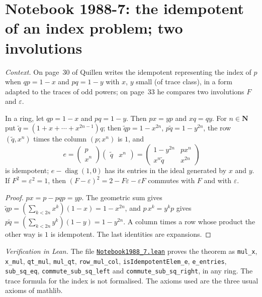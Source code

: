 \section[Notebook 1988-7: the idempotent of an index problem]{Notebook 1988-7: the idempotent of an index problem; two involutions\protect{}}\label{sec:quillen-1988-7}

\emph{Context.} On page~30 of  Quillen writes the idempotent representing the index of $p$ when $qp = 1 - x$ and $pq = 1 - y$ with $x$, $y$ small (of trace class), in a form adapted to the traces of odd powers; on page~33 he compares two involutions $F$ and $\varepsilon$.

\begin{encadre}
\begin{theoreme}\label{thm:quillen-1988-7}
In a ring, let $qp = 1 - x$ and $pq = 1 - y$. Then $px = yp$ and $xq = qy$. For $n \in \mathbf N$ put $\tilde q = (1 + x + \cdots + x^{2n-1})q$; then $\tilde qp = 1 - x^{2n}$, $p\tilde q = 1 - y^{2n}$, the row $(\tilde q, x^n)$ times the column $(p; x^n)$ is $1$, and
\[
e = \begin{pmatrix} p\\ x^n\end{pmatrix}\begin{pmatrix}\tilde q & x^n\end{pmatrix} = \begin{pmatrix} 1 - y^{2n} & px^n\\ x^n\tilde q & x^{2n}\end{pmatrix}
\]
is idempotent; $e - \operatorname{diag}(1, 0)$ has its entries in the ideal generated by $x$ and $y$. If $F^2 = \varepsilon^2 = 1$, then $(F - \varepsilon)^2 = 2 - F\varepsilon - \varepsilon F$ commutes with $F$ and with $\varepsilon$.
\end{theoreme}
\end{encadre}

\begin{proof}
$px = p - pqp = yp$. The geometric sum gives $\tilde qp = (\sum_{k<2n}x^k)(1 - x) = 1 - x^{2n}$, and $p\,x^k = y^kp$ gives $p\tilde q = (\sum_{k<2n} y^k)(1 - y) = 1 - y^{2n}$. A column times a row whose product the other way is $1$ is idempotent. The last identities are expansions.
\end{proof}

\emph{Verification in Lean.} The file \href{\leanblobmain/Notebook1988_7.lean}{\texttt{Notebook1988\_7.\allowbreak{}lean}} proves the theorem as \texttt{mul\_x}, \texttt{x\_mul}, \texttt{qt\_mul}, \texttt{mul\_qt}, \texttt{row\_mul\_col}, \texttt{isIdempotentElem\_e}, \texttt{e\_entries}, \texttt{sub\_sq\_eq}, \texttt{commute\_sub\_sq\_left} and \texttt{commute\_sub\_sq\_right}, in any ring. The trace formula for the index is not formalised. The axioms used are the three usual axioms of mathlib.

